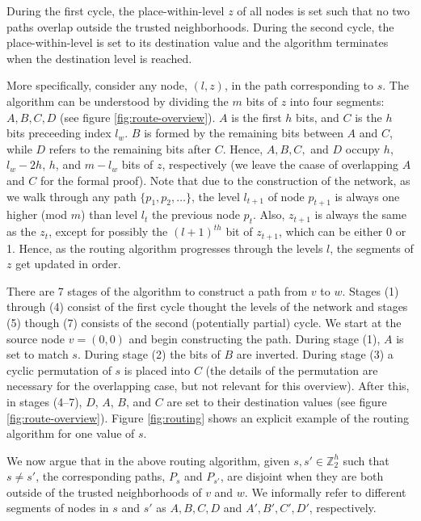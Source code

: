 \documentclass[prodmode,permissions]{acmsmall-ec16}
\begin{document}
During the first cycle, the place-within-level $z$ of all nodes is set such that
no two paths overlap outside the trusted neighborhoods.
During the second cycle, the place-within-level is set to its destination value
and the algorithm terminates when the destination level is reached.

More specifically, consider any node, $(l,z)$, in the path corresponding to $s$. The algorithm can be understood by dividing the $m$ bits of
$z$ into four segments: $A, B, C, D$ (see figure \ref{fig:route-overview}).
$A$ is the first $h$ bits,
and $C$ is the $h$ bits preceeding index $l_w$.
$B$ is formed by the remaining bits between $A$ and $C$,
while $D$ refers to the remaining bits after $C$.
Hence, $A, B, C, $ and $D$ occupy $h$, $l_w - 2h$, $h$, and $m - l_w$ bits of $z$, respectively
(we leave the caase of overlapping $A$ and $C$ for the formal proof).
Note that due to the construction of the network,
as we walk through any path $\{p_1, p_2, \dots\}$,
the level $l_{t+1}$ of node $p_{t+1}$ is always one higher (mod $m$)
than level $l_t$ the previous node $p_t$.
Also, $z_{t+1}$ is always the same as the $z_t$,
except for possibly the $(l+1)^{th}$ bit of $z_{t+1}$,
which can be either 0 or 1.
Hence, as the routing algorithm progresses through the levels $l$,
the segments of $z$ get updated in order. 

There are 7 stages of the algorithm to construct a path from $v$ to $w$.
Stages (1) through (4) consist of the first cycle thought the levels of
the network and stages (5) though (7) consists of the second
(potentially partial) cycle.
We start at the source node $v = (0,0)$ and begin constructing the path.
During stage (1), $A$ is set to match $s$.
During stage (2) the bits of $B$ are inverted.
During stage (3) a cyclic permutation of $s$ is placed into $C$
(the details of the permutation are necessary for the overlapping case,
but not relevant for this overview).
After this, in stages (4--7), $D$, $A$, $B$, and $C$ are set to their
destination values (see figure \ref{fig:route-overview}).
Figure \ref{fig:routing} shows an explicit example of the routing algorithm
for one value of $s$.

We now argue that in the above routing algorithm,
given $s, s' \in \mathbb{Z}_2^h$ such that $s \neq s'$,
the corresponding paths, $P_s$ and $P_{s'}$,
are disjoint when they are both outside of the trusted neighborhoods of
$v$ and $w$.
We informally refer to different segments of nodes in $s$ and $s'$ as
$A,B,C,D$ and $A',B',C',D'$, respectively.
\end{document}
